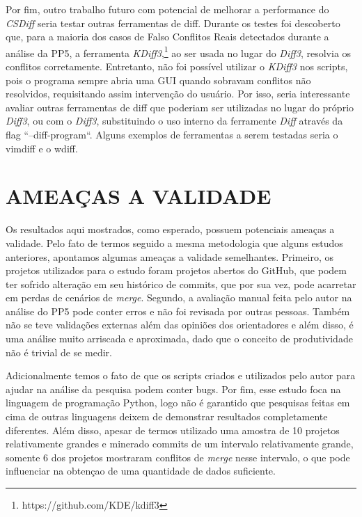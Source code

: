Por fim, outro trabalho futuro com potencial de melhorar a performance do
\emph{CSDiff} seria testar outras ferramentas de diff. Durante os testes foi
descoberto que, para a maioria dos casos de Falso Conflitos Reais detectados
durante a análise da PP5, a ferramenta
\emph{KDiff3},\footnote{https://github.com/KDE/kdiff3} ao ser usada no lugar do
\emph{Diff3}, resolvia os conflitos corretamente. Entretanto, não foi possível
utilizar o \emph{KDiff3} nos scripts, pois o programa sempre abria uma GUI
quando sobravam conflitos não resolvidos, requisitando assim intervenção do
usuário. Por isso, seria interessante avaliar outras ferramentas de diff que
poderiam ser utilizadas no lugar do próprio \emph{Diff3}, ou com o
\emph{Diff3}, substituindo o uso interno da ferramente \emph{Diff} através da
flag ``--diff-program``. Alguns exemplos de ferramentas a serem testadas seria o
vimdiff e o wdiff.

\section{AMEAÇAS A VALIDADE}

Os resultados aqui mostrados, como esperado, possuem potenciais ameaças a
validade. Pelo fato de termos seguido a mesma metodologia que alguns estudos
anteriores, apontamos algumas ameaças a validade semelhantes. Primeiro, os
projetos utilizados para o estudo foram projetos abertos do GitHub, que podem
ter sofrido alteração em seu histórico de commits, que por sua vez, pode
acarretar em perdas de cenários de \emph{merge}. Segundo, a avaliação manual
feita pelo autor na análise do PP5 pode conter erros e não foi revisada por
outras pessoas. Também não se teve validações externas além das opiniões dos
orientadores e além disso, é uma análise muito arriscada e aproximada, dado que
o conceito de produtividade não é trivial de se medir.

Adicionalmente temos o fato de que os scripts criados e utilizados pelo
autor para ajudar na análise da pesquisa podem conter bugs. Por fim, esse
estudo foca na linguagem de programação Python, logo não é garantido que
pesquisas feitas em cima de outras linguagens deixem de demonstrar resultados
completamente diferentes. Além disso, apesar de termos utilizado uma amostra de
10 projetos relativamente grandes e minerado commits de um intervalo
relativamente grande, somente 6 dos projetos mostraram conflitos de
\emph{merge} nesse intervalo, o que pode influenciar na obtençao de uma
quantidade de dados suficiente.





